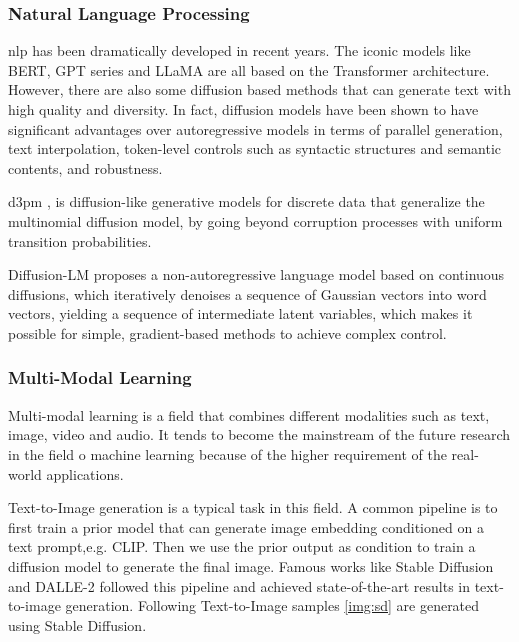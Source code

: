 \documentclass[12pt,DIV14,BCOR12mm,a4paper,footinclude=false,headinclude,parskip=half-,twoside,openright,cleardoublepage=empty,toc=index,bibliography=totoc,listof=totoc]{scrreprt}
\numberwithin{equation}{chapter}
\begin{document}
\subsubsection{Natural Language Processing}
\gls{nlp} has been dramatically developed in recent years. The iconic models like BERT\cite{devlin2019bert}, GPT series\cite{Radford2018ImprovingLU} and LLaMA\cite{touvron2023llama} are all based on the Transformer architecture. However, there are also some diffusion based methods that can generate text with high quality and diversity. In fact, diffusion models have been shown to have significant advantages over autoregressive models in terms of parallel generation, text interpolation, token-level controls such as syntactic structures and semantic contents, and robustness\cite{zou2023survey}.

\gls{d3pm} \cite{austin2023structured}, is diffusion-like generative models for discrete data that generalize the multinomial diffusion model\cite{hoogeboom2021argmax}, by going beyond corruption processes with uniform transition probabilities. 

Diffusion-LM\cite{li2022diffusionlm} proposes a non-autoregressive language model based on continuous diffusions, which iteratively denoises a sequence of Gaussian vectors into word vectors, yielding a sequence of intermediate latent variables, which makes it possible for simple, gradient-based methods to achieve complex control.
\subsubsection{Multi-Modal Learning}
Multi-modal learning is a field that combines different modalities such as text, image, video and audio. It tends to become the mainstream of the future research in the field o machine learning because of the higher requirement of the real-world applications.

Text-to-Image generation is a typical task in this field. A common pipeline is to first train a prior model that can generate image embedding conditioned on a text prompt,e.g. CLIP\cite{radford2021learning}. Then we use the prior output as condition to train a diffusion model to generate the final image. Famous works like Stable Diffusion\cite{rombach2022highresolution} and DALLE-2\cite{ramesh2022hierarchical} followed this pipeline and achieved state-of-the-art results in text-to-image generation. Following Text-to-Image samples \ref{img:sd} are generated using Stable Diffusion.
\end{document}

